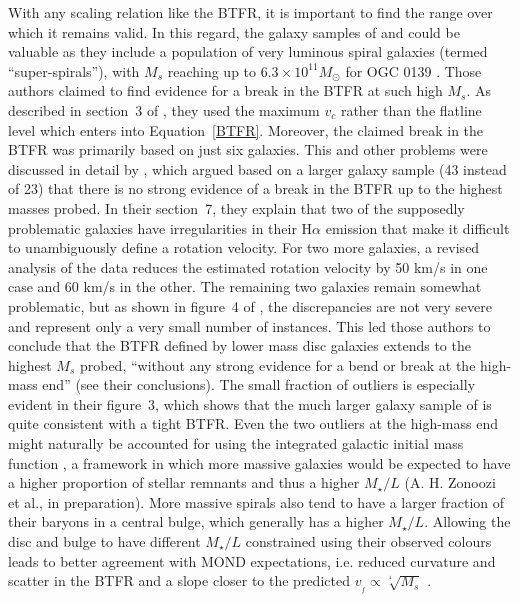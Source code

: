 \documentclass[fleqn,usenatbib,useAMS]{mnras} %
\begin{document}
With any scaling relation like the BTFR, it is important to find the range over which it remains valid. In this regard, the galaxy samples of \citet{Ogle_2016} and \citet{Ogle_2019_catalogue} could be valuable as they include a population of very luminous spiral galaxies (termed ``super-spirals''), with $M_s$ reaching up to $6.3 \times 10^{11} M_\odot$ for OGC 0139 \citep{Ogle_2019}. Those authors claimed to find evidence for a break in the BTFR at such high $M_s$. As described in section~3 of \citet{Ogle_2019}, they used the maximum $v_c$ rather than the flatline level which enters into Equation~\ref{BTFR}. Moreover, the claimed break in the BTFR was primarily based on just six galaxies. This and other problems were discussed in detail by \citet{Teodoro_2021}, which argued based on a larger galaxy sample (43 instead of 23) that there is no strong evidence of a break in the BTFR up to the highest masses probed. In their section~7, they explain that two of the supposedly problematic galaxies have irregularities in their H$\alpha$ emission that make it difficult to unambiguously define a rotation velocity. For two more galaxies, a revised analysis of the data reduces the estimated rotation velocity by 50 km/s in one case and 60 km/s in the other. The remaining two galaxies remain somewhat problematic, but as shown in figure~4 of \citet{Teodoro_2021}, the discrepancies are not very severe and represent only a very small number of instances. This led those authors to conclude that the BTFR defined by lower mass disc galaxies extends to the highest $M_s$ probed, ``without any strong evidence for a bend or break at the high-mass end'' (see their conclusions). The small fraction of outliers is especially evident in their figure~3, which shows that the much larger galaxy sample of \citet{Posti_2018} is quite consistent with a tight BTFR. Even the two outliers at the high-mass end might naturally be accounted for using the integrated galactic initial mass function \citep[IGIMF;][]{Kroupa_2003, Weidner_2006, Jerabkova_2018, Yan_2021}, a framework in which more massive galaxies would be expected to have a higher proportion of stellar remnants and thus a higher $M_{\star}/L$ (A. H. Zonoozi et al., in preparation). More massive spirals also tend to have a larger fraction of their baryons in a central bulge, which generally has a higher $M_{\star}/L$. Allowing the disc and bulge to have different $M_{\star}/L$ constrained using their observed colours leads to better agreement with MOND expectations, i.e. reduced curvature and scatter in the BTFR and a slope closer to the predicted $v_{_f} \propto \sqrt[^4]{M_s}$ \citep*{Schombert_2022}.
\end{document}
